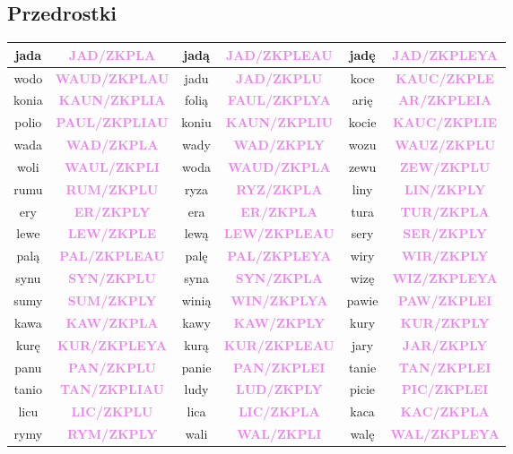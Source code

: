 \documentclass[12p, oneside]{book}
\newcommand{\steno}[1]{\textbf{\textsf{\textcolor{violet}{ #1}}}}
\begin{document}
\subsection*{Przedrostki}
\begin{longtable}{|c c|c c|c c|}
	\hline
	jada & \steno{JAD/ZKPLA} & jadą & \steno{JAD/ZKPLEAU} & jadę & \steno{JAD/ZKPLEYA} \\ \hline
	wodo & \steno{WAUD/ZKPLAU} & jadu & \steno{JAD/ZKPLU} & koce & \steno{KAUC/ZKPLE} \\ \hline
	konia & \steno{KAUN/ZKPLIA} & folią & \steno{FAUL/ZKPLYA} & arię & \steno{AR/ZKPLEIA} \\ \hline
	polio & \steno{PAUL/ZKPLIAU} & koniu & \steno{KAUN/ZKPLIU} & kocie & \steno{KAUC/ZKPLIE} \\ \hline
	wada & \steno{WAD/ZKPLA} & wady & \steno{WAD/ZKPLY} & wozu & \steno{WAUZ/ZKPLU} \\ \hline
	woli & \steno{WAUL/ZKPLI} & woda & \steno{WAUD/ZKPLA} & zewu & \steno{ZEW/ZKPLU} \\ \hline
	rumu & \steno{RUM/ZKPLU} & ryza & \steno{RYZ/ZKPLA} & liny & \steno{LIN/ZKPLY} \\ \hline
	ery & \steno{ER/ZKPLY} & era & \steno{ER/ZKPLA} & tura & \steno{TUR/ZKPLA} \\ \hline
	lewe & \steno{LEW/ZKPLE} & lewą & \steno{LEW/ZKPLEAU} & sery & \steno{SER/ZKPLY} \\ \hline
	palą & \steno{PAL/ZKPLEAU} & palę & \steno{PAL/ZKPLEYA} & wiry & \steno{WIR/ZKPLY} \\ \hline
	synu & \steno{SYN/ZKPLU} & syna & \steno{SYN/ZKPLA} & wizę & \steno{WIZ/ZKPLEYA} \\ \hline
	sumy & \steno{SUM/ZKPLY} & winią & \steno{WIN/ZKPLYA} & pawie & \steno{PAW/ZKPLEI} \\ \hline
	kawa & \steno{KAW/ZKPLA} & kawy & \steno{KAW/ZKPLY} & kury & \steno{KUR/ZKPLY} \\ \hline
	kurę & \steno{KUR/ZKPLEYA} & kurą & \steno{KUR/ZKPLEAU} & jary & \steno{JAR/ZKPLY} \\ \hline
	panu & \steno{PAN/ZKPLU} & panie & \steno{PAN/ZKPLEI} & tanie & \steno{TAN/ZKPLEI} \\ \hline
	tanio & \steno{TAN/ZKPLIAU} & ludy & \steno{LUD/ZKPLY} & picie & \steno{PIC/ZKPLEI} \\ \hline
	licu & \steno{LIC/ZKPLU} & lica & \steno{LIC/ZKPLA} & kaca & \steno{KAC/ZKPLA} \\ \hline
	rymy & \steno{RYM/ZKPLY} & wali & \steno{WAL/ZKPLI} & walę & \steno{WAL/ZKPLEYA} \\ \hline

\end{longtable}
\end{document}
